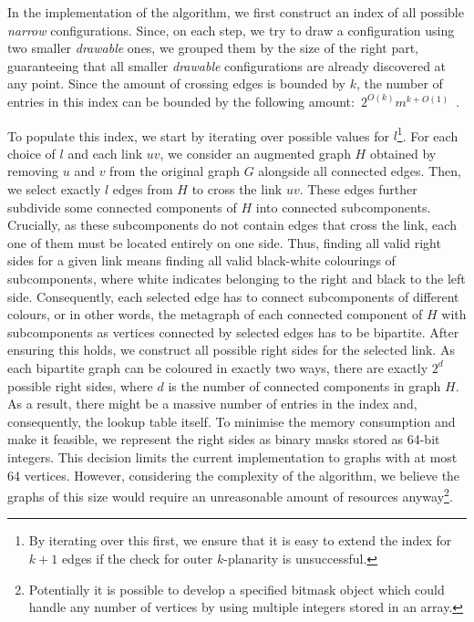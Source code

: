 In the implementation of the algorithm, we first construct an index of all possible \emph{narrow} configurations. Since, on each step, we try to draw a configuration using two smaller \emph{drawable} ones, we grouped them by the size of the right part, guaranteeing that all smaller \emph{drawable} configurations are already discovered at any point. Since the amount of crossing edges is bounded by \(k\), the number of entries in this index can be bounded by the following amount:~\(2^{O(k)}m^{k+O(1)}\)~\cite[Lemma 15]{okp}.

To populate this index, we start by iterating over possible values for \(l\)\footnote{By iterating over this first, we ensure that it is easy to extend the index for \(k+1\) edges if the check for outer \(k\)-planarity is unsuccessful.}. For each choice of \(l\) and each link \(uv\), we consider an augmented graph \(H\) obtained by removing \(u\) and \(v\) from the original graph \(G\) alongside all connected edges. Then, we select exactly \(l\) edges from \(H\) to cross the link \(uv\). These edges further subdivide some connected components of \(H\) into connected subcomponents. Crucially, as these subcomponents do not contain edges that cross the link, each one of them must be located entirely on one side. Thus, finding all valid right sides for a given link means finding all valid black-white colourings of subcomponents, where white indicates belonging to the right and black to the left side. Consequently, each selected edge has to connect subcomponents of different colours, or in other words, the metagraph of each connected component of \(H\) with subcomponents as vertices connected by selected edges has to be bipartite. After ensuring this holds, we construct all possible right sides for the selected link. As each bipartite graph can be coloured in exactly two ways, there are exactly \(2^d\) possible right sides, where \(d\) is the number of connected components in graph \(H\). As a result, there might be a massive number of entries in the index and, consequently, the lookup table itself. To minimise the memory consumption and make it feasible, we represent the right sides as binary masks stored as 64-bit integers. This decision limits the current implementation to graphs with at most 64 vertices. However, considering the complexity of the algorithm, we believe the graphs of this size would require an unreasonable amount of resources anyway\footnote{Potentially it is possible to develop a specified bitmask object which could handle any number of vertices by using multiple integers stored in an array.}.

